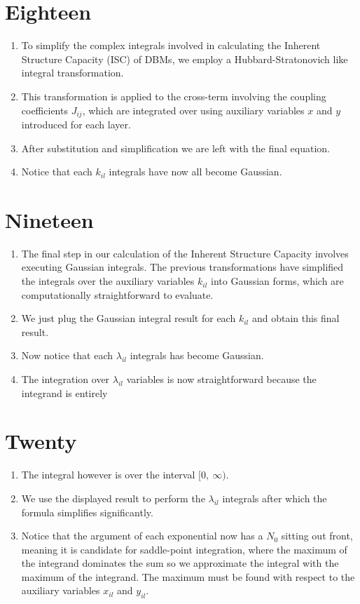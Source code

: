 \documentclass{article}
\begin{document}
\section*{Eighteen}
\begin{enumerate}
    \item To simplify the complex integrals involved in calculating the Inherent Structure Capacity (ISC) of DBMs, we employ a Hubbard-Stratonovich like integral transformation.
    \item This transformation is applied to the cross-term involving the coupling coefficients \(J_{ij}\), which are integrated over using auxiliary variables \(x\) and \(y\) introduced for each layer.
    \item After substitution and simplification we are left with the final equation.
    \item Notice that each \(k_{il}\) integrals have now all become Gaussian.
\end{enumerate}

\section*{Nineteen}
\begin{enumerate}
    \item The final step in our calculation of the Inherent Structure Capacity involves executing Gaussian integrals. The previous transformations have simplified the integrals over the auxiliary variables \( k_{il} \) into Gaussian forms, which are computationally straightforward to evaluate.
    \item We just plug the Gaussian integral result for each \(k_{il}\) and obtain this final result.
    \item Now notice that each \(\lambda_{il}\) integrals has become Gaussian.
    \item The integration over \( \lambda_{il} \) variables is now straightforward because the integrand is entirely
\end{enumerate}

\section*{Twenty}
\begin{enumerate}
    \item The integral however is over the interval \([0,~\infty)\).
    \item We use the displayed result to perform the \(\lambda_{il}\) integrals after which the formula simplifies significantly.
    \item Notice that the argument of each exponential now has a \(N_{0}\) sitting out front, meaning it is candidate for saddle-point integration, where the maximum of the integrand dominates the sum so we approximate the integral with the maximum of the integrand. The maximum must be found with respect to the auxiliary variables \(x_{il}\) and \(y_{il}\).
\end{enumerate}
\end{document}
